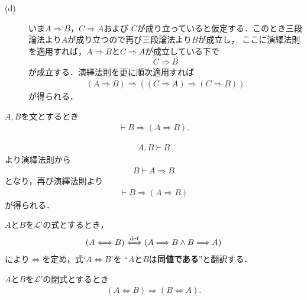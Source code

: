 \begin{prf}
\begin{description}
			\item[(d)]
				いま$A \Longrightarrow B$，$C \Longrightarrow A$および
				$C$が成り立っていると仮定する．このとき三段論法より$A$が成り立つので再び三段論法より$B$が成立し，
				ここに演繹法則を適用すれば，$A \Longrightarrow B$と$C \Longrightarrow A$が成立している下で
				\begin{align}
					C \Longrightarrow B
				\end{align}
				が成立する．演繹法則を更に順次適用すれば
				\begin{align}
					(A \Longrightarrow B) \Longrightarrow ( (C \Longrightarrow A) \Longrightarrow (C \Longrightarrow B) )
				\end{align}
				が得られる．
				\QED
		\end{description}
	\end{prf}
	
	\begin{screen}
		\begin{logicalthm}[正しい式は仮定を選ばない]\label{logicalthm:rule_of_inference_2}
			$A,B$を文とするとき
			\begin{align}
				\vdash B \Longrightarrow (A \Longrightarrow B).
			\end{align}
		\end{logicalthm}
	\end{screen}
	
	\begin{prf}
		\begin{align}
			A,B \vdash B
		\end{align}
		より演繹法則から
		\begin{align}
			B \vdash A \Longrightarrow B
		\end{align}
		となり，再び演繹法則より
		\begin{align}
			\vdash B \Longrightarrow (A \Longrightarrow B)
		\end{align}
		が得られる．
		\QED
	\end{prf}
	
	$A$と$B$を$\mathcal{L}'$の式とするとき，
	\begin{align}
		(A \Longleftrightarrow B) \overset{\mathrm{def}}{\Longleftrightarrow}
		(A \Longrightarrow B \wedge B \Longrightarrow A)
	\end{align}
	により$\Longleftrightarrow$を定め，式`$A \Longleftrightarrow B$'を
	``$A$と$B$は{\bf 同値である}''と翻訳する．
	
	\begin{screen}
		\begin{logicalthm}[同値記号の可換律]\label{logicalthm:commutative_law_of_equivalence}
			$A$と$B$を$\mathcal{L}'$の閉式とするとき
			\begin{align}
				(A \Longleftrightarrow B) \Longrightarrow (B \Longleftrightarrow A).
			\end{align}
		\end{logicalthm}
	\end{screen}
	
